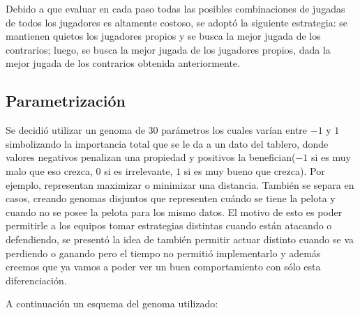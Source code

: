 Debido a que evaluar en cada paso todas las posibles combinaciones de jugadas de
todos los jugadores es altamente costoso, se adoptó la siguiente estrategia: se
mantienen quietos los jugadores propios y se busca la mejor jugada de los
contrarios; luego, se busca la mejor jugada de los jugadores propios, dada la
mejor jugada de los contrarios obtenida anteriormente.

\subsection{Parametrización}

Se decidió utilizar un genoma de 30 parámetros los cuales varían entre $-1$ y
$1$ simbolizando la importancia total que se le da a un dato del tablero, donde valores
 negativos penalizan una propiedad y positivos la benefician($-1$ si es muy malo
 que eso crezca, $0$ si es irrelevante, $1$ si es muy bueno que
crezca). Por ejemplo, representan maximizar o minimizar una distancia. También se
separa en casos, creando genomas disjuntos que representen cuándo se tiene la
pelota y cuando no se posee la pelota para los mismo datos. El motivo de esto es
poder permitirle a los equipos tomar estrategias distintas cuando están atacando
o defendiendo, se presentó la idea de también permitir actuar distinto cuando se
va perdiendo o ganando pero el tiempo no permitió implementarlo y además creemos
que ya vamos a poder ver un buen comportamiento con sólo esta diferenciación.


A continuación un esquema del genoma utilizado:

